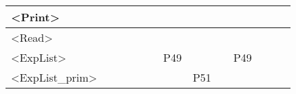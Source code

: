 \documentclass[12pt]{article}
\begin{document}
\begin{table}[H]
\begin{tabular}{|l|l|l|l|l|l|l|l|l|l|l|l|l|}
		\textless{}Print\textgreater{}           &                &              &             &                           &    &     &     &     &     &     &                 &     \\ \hline
		\textless{}Read\textgreater{}            &                &              &             &                           &    &     &     &     &     &     &                 &     \\ \hline
		\textless{}ExpList\textgreater{}         &                &              &             &                           &    & P49 &     &     & P49 &     &                 &     \\ \hline
		\textless{}ExpList\_prim\textgreater{}   &                &              &             &                           &    &     & P51 &     &     &     &                 &     \\ \hline
	\end{tabular}
\end{table}
\end{document}
